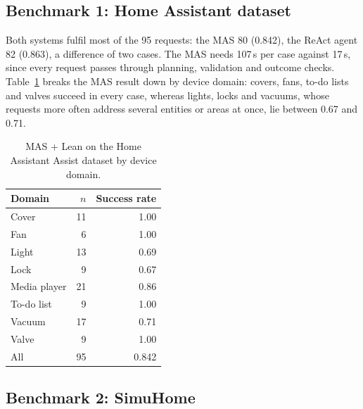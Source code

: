 \documentclass[a4paper,11pt]{article}
\begin{document}
\subsection{Benchmark 1: Home Assistant dataset}
\label{sec:eval-ha}

Both systems fulfil most of the 95 requests: the MAS 80 (0.842), the ReAct agent 82 (0.863), a
difference of two cases. The MAS needs 107\,s per case against 17\,s, since every request passes
through planning, validation and outcome checks. Table~\ref{tab:gemma4-homeassistant} breaks the
MAS result down by device domain: covers, fans, to-do lists and valves succeed in every case,
whereas lights, locks and vacuums, whose requests more often address several entities or areas at
once, lie between 0.67 and 0.71.

\begin{table}[htbp]
  \centering
  \small
  \caption{MAS + Lean on the Home Assistant Assist dataset by device domain.}
  \label{tab:gemma4-homeassistant}
  \begin{tabular}{lrr}
    \toprule
    Domain        & $n$ & Success rate \\
    \midrule
    Cover         & 11  & 1.00 \\
    Fan           & 6   & 1.00 \\
    Light         & 13  & 0.69 \\
    Lock          & 9   & 0.67 \\
    Media player  & 21  & 0.86 \\
    To-do list    & 9   & 1.00 \\
    Vacuum        & 17  & 0.71 \\
    Valve         & 9   & 1.00 \\
    \midrule
    All           & 95  & 0.842 \\
    \bottomrule
  \end{tabular}
\end{table}

\subsection{Benchmark 2: SimuHome}
\label{sec:eval-simuhome}
\end{document}
